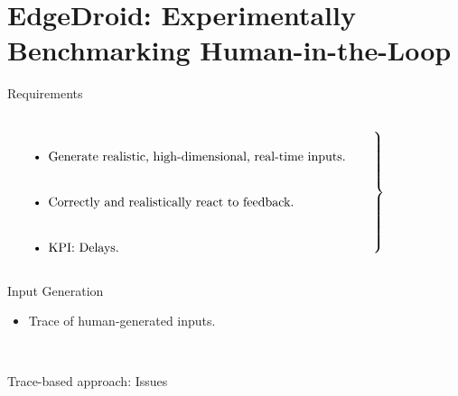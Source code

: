 \documentclass[aspectratio=1610]{beamer}
\begin{document}
\section{EdgeDroid: Experimentally Benchmarking Human-in-the-Loop}
\begin{frame}{Requirements}
    \begin{columns}[onlytextwidth]
        \begin{column}{.5\linewidth}
            $\left.
            \begin{tabular}{p{.8\linewidth}}
                \begin{itemize}
                    \itemsep2em
                    \item Generate realistic, high-dimensional, real-time inputs.
                    \item Correctly and realistically react to feedback.
                    \item KPI: Delays.
                \end{itemize}
            \end{tabular}%
            \right\}$
        \end{column}%
        \begin{column}{.5\linewidth}
            \centering%
            \Large\bfseries%
            \\
        \end{column}
    \end{columns}
\end{frame}

\begin{frame}{Input Generation}
    \begin{itemize}
        \item Trace of human-generated inputs.
    \end{itemize}
    \begin{center}
        \\
    \end{center}
\end{frame}

\begin{frame}{Trace-based approach: Issues}
\end{frame}
\end{document}
